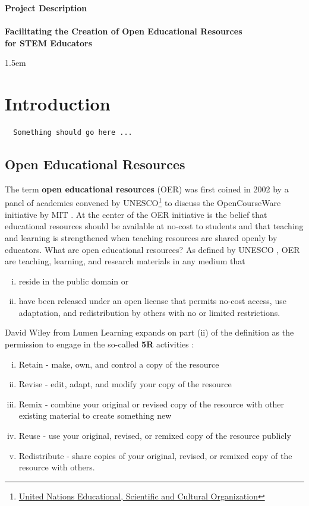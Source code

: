 \documentclass[11pt]{article}
\begin{document}
\begin{center}
\textbf{\Large Project Description}\\[0.25cm]
\hrulefill\\[0.25cm]
\textbf{\Large Facilitating the Creation of Open Educational Resources \\[1ex] for STEM Educators}\\
\hrulefill
\end{center}
\baselineskip 1.5em

\section{Introduction}
\begin{verbatim}
  Something should go here ...
\end{verbatim}

\subsection{Open Educational Resources}
The term \textbf{open educational resources} (OER) was first coined in 2002 by a panel of academics convened by UNESCO\footnote{\href{https://www.unesco.org/en}{United Nations Educational, Scientific and Cultural Organization}} to discuss the OpenCourseWare initiative by MIT \cite{oerguidelines}.  At the center of the OER initiative is the belief that educational resources should be available at no-cost to students and that teaching and learning is strengthened when teaching resources are shared openly by educators. What are open educational resources?  As defined by UNESCO \cite{oerworldcongress}, OER are teaching, learning, and research materials in any medium that
\begin{enumerate}[(i)]
\item reside in the public domain or
\item have been released under an open license that permits no-cost access, use adaptation, and redistribution by others with no or limited restrictions.
\end{enumerate}
David Wiley from Lumen Learning expands on part (ii) of the definition as the permission to engage in the so-called \textbf{5R} activities \cite{wileynd}:
\begin{enumerate}[(i)]
  \item Retain - make, own, and control a copy of the resource
  \item Revise - edit, adapt, and modify your copy of the resource
  \item Remix - combine your original or revised copy of the resource with other existing material to create something new
  \item Reuse - use your original, revised, or remixed copy of the resource publicly
  \item Redistribute - share copies of your original, revised, or remixed copy of the resource with others.
\end{enumerate}
\end{document}
